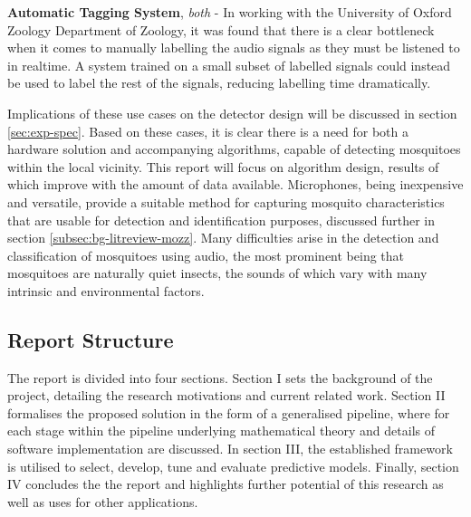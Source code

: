 \begin{sitemize}
            \item{\textbf{Automatic Tagging System}, \textit{both} - In working with the University of Oxford Zoology Department of Zoology, it was found that there is a clear bottleneck when it comes to manually labelling the audio signals as they must be listened to in realtime. A system trained on a small subset of labelled signals could instead be used to label the rest of the signals, reducing labelling time dramatically.}
        \end{sitemize}
        Implications of these use cases on the detector design will be discussed in section \ref{sec:exp-spec}. Based on these cases, it is clear there is a need for both a hardware solution and accompanying algorithms, capable of detecting mosquitoes within the local vicinity. This report will focus on algorithm design, results of which improve with the amount of data available. Microphones, being inexpensive and versatile, provide a suitable method for capturing mosquito characteristics that are usable for detection and identification purposes, discussed further in section \ref{subsec:bg-litreview-mozz}. Many difficulties arise in the detection and classification of mosquitoes using audio, the most prominent being that mosquitoes are naturally quiet insects, the sounds of which vary with many intrinsic and environmental factors.
        
        
        
        
        
        
  
    \subsection{Report Structure}
    \label{subsec:bg-intro-structure}
        The report is divided into four sections. Section I sets the background of the project, detailing the research motivations and current related work. Section II formalises the proposed solution in the form of a generalised pipeline, where for each stage within the pipeline underlying mathematical theory and details of software implementation are discussed. In section III, the established framework is utilised to select, develop, tune and evaluate predictive models. Finally, section IV concludes the the report and highlights further potential of this research as well as uses for other applications.